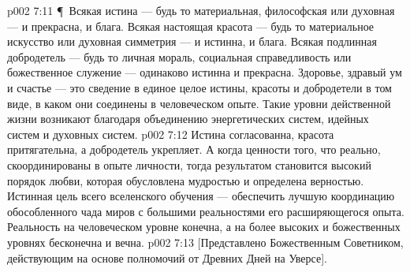 \vs p002 7:11 \P\ Всякая истина --- будь то материальная, философская или духовная --- и прекрасна, и блага. Всякая настоящая красота --- будь то материальное искусство или духовная симметрия --- и истинна, и блага. Всякая подлинная добродетель --- будь то личная мораль, социальная справедливость или божественное служение --- одинаково истинна и прекрасна. Здоровье, здравый ум и счастье --- это сведение в единое целое истины, красоты и добродетели в том виде, в каком они соединены в человеческом опыте. Такие уровни действенной жизни возникают благодаря объединению энергетических систем, идейных систем и духовных систем.
\vs p002 7:12 Истина согласованна, красота притягательна, а добродетель укрепляет. А когда ценности того, что реально, скоординированы в опыте личности, тогда результатом становится высокий порядок любви, которая обусловлена мудростью и определена верностью. Истинная цель всего вселенского обучения --- обеспечить лучшую координацию обособленного чада миров с большими реальностями его расширяющегося опыта. Реальность на человеческом уровне конечна, а на более высоких и божественных уровнях бесконечна и вечна.
\vs p002 7:13 [Представлено Божественным Советником, действующим на основе полномочий от Древних Дней на Уверсе].
